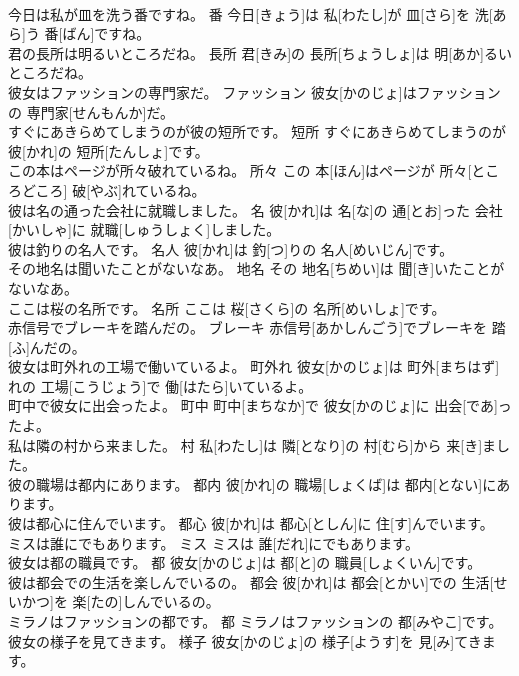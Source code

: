 \documentclass[8pt]{extreport}
\begin{document}
\begin{CJK}{UTF8}{min}
\\	今日は私が皿を洗う番ですね。	番	今日[きょう]は 私[わたし]が 皿[さら]を 洗[あら]う 番[ばん]ですね。	
\\	君の長所は明るいところだね。	長所	君[きみ]の 長所[ちょうしょ]は 明[あか]るいところだね。	
\\	彼女はファッションの専門家だ。	ファッション	彼女[かのじょ]はファッションの 専門家[せんもんか]だ。	
\\	すぐにあきらめてしまうのが彼の短所です。	短所	すぐにあきらめてしまうのが 彼[かれ]の 短所[たんしょ]です。	
\\	この本はページが所々破れているね。	所々	この 本[ほん]はページが 所々[ところどころ] 破[やぶ]れているね。	
\\	彼は名の通った会社に就職しました。	名	彼[かれ]は 名[な]の 通[とお]った 会社[かいしゃ]に 就職[しゅうしょく]しました。	
\\	彼は釣りの名人です。	名人	彼[かれ]は 釣[つ]りの 名人[めいじん]です。	
\\	その地名は聞いたことがないなあ。	地名	その 地名[ちめい]は 聞[き]いたことがないなあ。	
\\	ここは桜の名所です。	名所	ここは 桜[さくら]の 名所[めいしょ]です。	
\\	赤信号でブレーキを踏んだの。	ブレーキ	赤信号[あかしんごう]でブレーキを 踏[ふ]んだの。	
\\	彼女は町外れの工場で働いているよ。	町外れ	彼女[かのじょ]は 町外[まちはず]れの 工場[こうじょう]で 働[はたら]いているよ。	
\\	町中で彼女に出会ったよ。	町中	町中[まちなか]で 彼女[かのじょ]に 出会[であ]ったよ。	
\\	私は隣の村から来ました。	村	私[わたし]は 隣[となり]の 村[むら]から 来[き]ました。	
\\	彼の職場は都内にあります。	都内	彼[かれ]の 職場[しょくば]は 都内[とない]にあります。	
\\	彼は都心に住んでいます。	都心	彼[かれ]は 都心[としん]に 住[す]んでいます。	
\\	ミスは誰にでもあります。	ミス	ミスは 誰[だれ]にでもあります。	
\\	彼女は都の職員です。	都	彼女[かのじょ]は 都[と]の 職員[しょくいん]です。	
\\	彼は都会での生活を楽しんでいるの。	都会	彼[かれ]は 都会[とかい]での 生活[せいかつ]を 楽[たの]しんでいるの。	
\\	ミラノはファッションの都です。	都	ミラノはファッションの 都[みやこ]です。	
\\	彼女の様子を見てきます。	様子	彼女[かのじょ]の 様子[ようす]を 見[み]てきます。	

\end{CJK}
\end{document}

